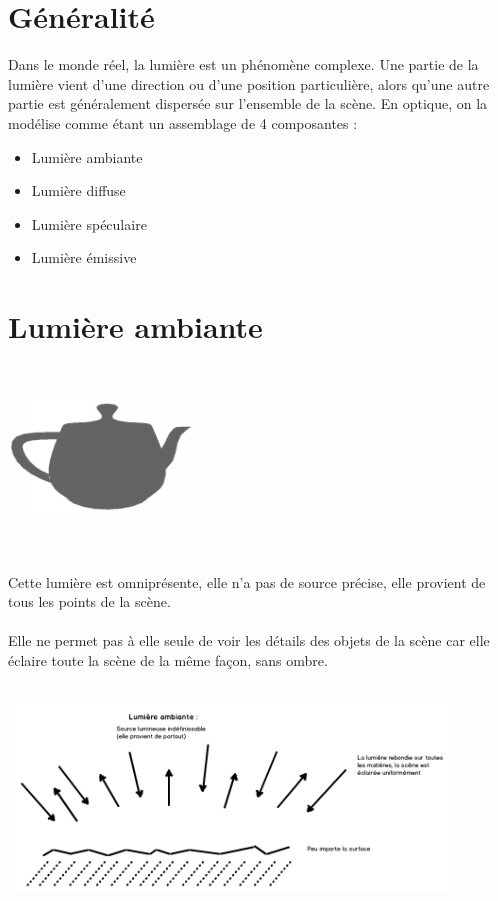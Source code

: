 \section{Généralité}
Dans le monde réel, la lumière est un phénomène complexe.
Une partie de la lumière vient d’une direction ou d’une position particulière, alors
qu’une autre partie est généralement dispersée sur l’ensemble de la scène. En optique, on la modélise comme étant un assemblage de 4 composantes :
\begin{itemize}
\item Lumière ambiante
\item Lumière diffuse
\item Lumière spéculaire
\item Lumière émissive
\end{itemize}

\section{Lumière ambiante}
\begin{center}
\includegraphics[width=5cm,height=5cm]{pipeline/images/objet_ambiante.png}
\end{center}
Cette lumière est omniprésente, elle n'a pas de source précise, elle provient de tous les points de la scène.
\\\\
Elle ne permet pas à elle seule de voir les détails des objets de la scène car elle éclaire toute la scène de la même façon, sans ombre.
\\\\
\begin{center}
\includegraphics[width=12cm,height=5cm]{pipeline/images/lumiere_ambiante.png}
\end{center}

